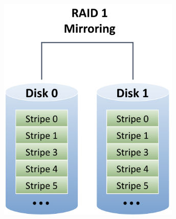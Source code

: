 \documentclass[../../compsys.tex]{subfiles}
\begin{document}
\begin{minipage}{0.45\textwidth}
    \begin{center}
        \includegraphics[width=0.65\textwidth]{chapters/L8/images/raid1.png}
    \end{center}
\end{minipage}
\end{document}
